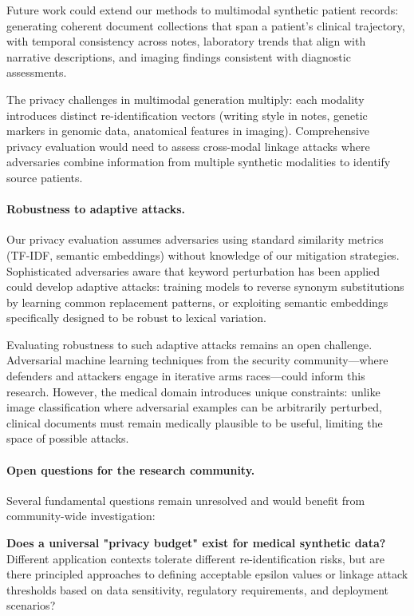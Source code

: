 Future work could extend our methods to multimodal synthetic patient records: generating coherent document collections that span a patient's clinical trajectory, with temporal consistency across notes, laboratory trends that align with narrative descriptions, and imaging findings consistent with diagnostic assessments.

The privacy challenges in multimodal generation multiply: each modality introduces distinct re-identification vectors (writing style in notes, genetic markers in genomic data, anatomical features in imaging).
Comprehensive privacy evaluation would need to assess cross-modal linkage attacks where adversaries combine information from multiple synthetic modalities to identify source patients.

\paragraph{Robustness to adaptive attacks.}

Our privacy evaluation assumes adversaries using standard similarity metrics (TF-IDF, semantic embeddings) without knowledge of our mitigation strategies.
Sophisticated adversaries aware that keyword perturbation has been applied could develop adaptive attacks: training models to reverse synonym substitutions by learning common replacement patterns, or exploiting semantic embeddings specifically designed to be robust to lexical variation.

Evaluating robustness to such adaptive attacks remains an open challenge.
Adversarial machine learning techniques from the security community—where defenders and attackers engage in iterative arms races—could inform this research.
However, the medical domain introduces unique constraints: unlike image classification where adversarial examples can be arbitrarily perturbed, clinical documents must remain medically plausible to be useful, limiting the space of possible attacks.

\paragraph{Open questions for the research community.}

Several fundamental questions remain unresolved and would benefit from community-wide investigation:

\textbf{Does a universal "privacy budget" exist for medical synthetic data?}
Different application contexts tolerate different re-identification risks, but are there principled approaches to defining acceptable epsilon values or linkage attack thresholds based on data sensitivity, regulatory requirements, and deployment scenarios?

